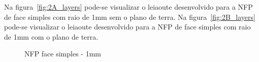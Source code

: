 Na figura~\ref{fig:2A_layers} pode-se visualizar o leiaoute desenvolvido para a NFP de face simples com raio de 1mm sem o plano de terra. Na figura~\ref{fig:2B_layers} pode-se visualizar o leiaoute desenvolvido para a NFP de face simples com raio de 1mm com o plano de terra.
\begin{figure}[htb!]
	\centering
 	\caption{NFP face simples - 1mm}
\end{figure}

